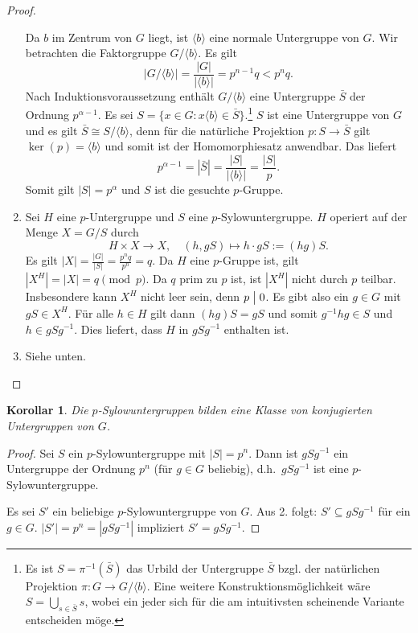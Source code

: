\documentclass[12pt]{scrartcl} %
\newcommand{\divides}{\mathrel{\bigm|}}
\newtheorem{kor}[thm]{Korollar}
\theoremstyle{definition}
\theoremstyle{remark}
\begin{document}
\begin{proof}
\begin{enumerate}
	Da $b$ im Zentrum von $G$ liegt, ist $\langle b \rangle$ eine normale Untergruppe von $G$.
	Wir betrachten die Faktorgruppe $G/ \langle b \rangle$.
	Es gilt $$|G/\langle b\rangle| = \frac{|G|}{|\langle b\rangle|} = p^{n-1}q < p^nq.$$
        Nach Induktionsvoraussetzung enthält $G/\langle b\rangle$ eine Untergruppe $\bar{S}$ der Ordnung $p^{\alpha - 1}$. Es sei $S = \{x \in G : x \langle b \rangle \in \bar{S}\}$.\footnote{Es ist \(S = \pi^{-1}(\bar S)\) das Urbild der Untergruppe \(\bar S\) bzgl. der natürlichen Projektion \(\pi: G \to G/\langle b\rangle\). Eine weitere Konstruktionsmöglichkeit wäre \(S = \bigcup_{s \in\bar S} s\), wobei ein jeder sich für die am intuitivsten scheinende Variante entscheiden möge.} %
	$S$ ist eine Untergruppe von \(G\) und es gilt $\bar{S} \cong S/\langle b\rangle$, denn für die natürliche Projektion $p: S \rightarrow \bar{S}$ gilt $\ker(p) = \langle b\rangle$ und somit ist der Homomorphiesatz anwendbar.
	Das liefert $$p^{\alpha - 1} = |\bar{S}| = \frac{|S|}{| \langle b \rangle |} = \frac{|S|}{p}.$$
	Somit gilt $|S| = p^{\alpha}$ und $S$ ist die gesuchte $p$-Gruppe.
\item Sei $H$ eine $p$-Untergruppe und $S$ eine $p$-Sylowuntergruppe.
	$H$ operiert auf der Menge $X = G/S$ durch
	$$H \times X \rightarrow X, \quad (h, gS) \mapsto h \cdot gS := (hg)S.$$
	Es gilt $|X| = \frac{|G|}{|S|} = \frac{p^nq}{p^n} = q$.
	Da $H$ eine $p$-Gruppe ist, gilt $|X^H| = |X| = q \pmod{p}$. %
	Da $q$ prim zu $p$ ist, ist $|X^H|$ nicht durch $p$ teilbar.
	Insbesondere kann $X^H$ nicht leer sein, denn $p \divides 0$.
	Es gibt also ein $g \in G$ mit $gS \in X^H$.
	Für alle $h \in H$ gilt dann $(hg)S = gS$ und somit $g^{-1}hg \in S$ und $h \in gSg^{-1}$.
	Dies liefert, dass $H$ in $gSg^{-1}$ enthalten ist.
\item Siehe unten. \qedhere
\end{enumerate}
\end{proof}

\begin{kor}\label{kor:SylowUGkonj}
	Die $p$-Sylowuntergruppen bilden eine Klasse von konjugierten Untergruppen von $G$.
\end{kor}

\begin{proof}
	Sei $S$ ein $p$-Sylowuntergruppe mit \(|S| = p^n\).
	Dann ist $gSg^{-1}$ ein Untergruppe der Ordnung $p^n$ (für $g \in G$ beliebig), d.h.\ $gSg^{-1}$ ist eine $p$-Sylowuntergruppe.

	Es sei $S'$ ein beliebige \(p\)-Sylowuntergruppe von $G$.
	Aus 2. folgt: $S' \subseteq gSg^{-1}$ für ein $g \in G$.
	$|S'| = p^n = |gSg^{-1}|$ impliziert $S' = gSg^{-1}$.
\end{proof}
\end{document}
